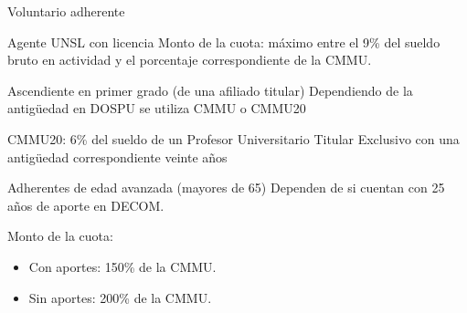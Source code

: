 \documentclass[10pt]{beamer}
\begin{document}
\begin{frame}{Voluntario adherente}
    \begin{block}{Agente UNSL con licencia}
        Monto de la cuota: máximo entre el 9\% del sueldo bruto en actividad y el porcentaje correspondiente de la CMMU.
    \end{block}
    \begin{block}{Ascendiente en primer grado (de una afiliado titular)}
        Dependiendo de la antigüedad en DOSPU se utiliza CMMU o CMMU20

        CMMU20: 6\% del sueldo de un Profesor Universitario Titular Exclusivo con una antigüedad correspondiente veinte años
    \end{block}
    \begin{block}{Adherentes de edad avanzada (mayores de 65)}
        Dependen de si cuentan con 25 años de aporte en DECOM.

        Monto de la cuota:
        \begin{itemize}
            \item Con aportes: 150\% de la CMMU.
            \item Sin aportes: 200\% de la CMMU.
        \end{itemize}
    \end{block}
\end{frame}

\end{document}
